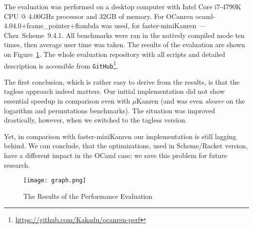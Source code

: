 The evaluation was performed on a desktop computer with Intel Core i7-4790K CPU @ 4.00GHz processor and 32GB of memory.
For OCanren \mbox{ocaml-4.04.0+frame_pointer+flambda} was used, for faster-miniKanren~--- Chez~Scheme~9.4.1.
All benchmarks were ran in the natively compiled mode ten times, then average user time was taken. The results of the evaluation
are shown on Figure~\ref{eval}. The whole evaluation repository with all scripts and detailed description is accessible 
from \lstinline{GitHub}\footnote{\url{https://github.com/Kakadu/ocanren-perf}}.

The first conclusion, which is rather easy to derive from the results, is that the tagless approach indeed matters. Our initial
implementation did not show essential speedup in comparison even with $\mu$Kanren (and was even \emph{slower} on the logarithm
and permutations benchmarks). The situation was improved drastically, however, when we switched to the tagless version.

Yet, in comparison with faster-miniKanren our implementation is still lagging behind. We can conclude, that the optimizations, 
used in Scheme/Racket version, have a different impact in the OCaml case; we save this problem for future research.

\begin{figure}[t]
\centering
\texttt{[image: graph.png]}
\caption{The Results of the Performance Evaluation}
\label{eval}
\end{figure}
